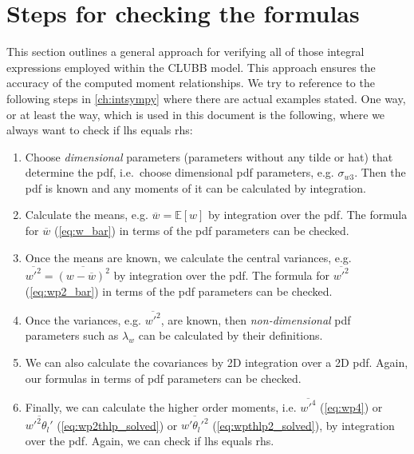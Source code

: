 \section{Steps for checking the formulas}\label{sec:steps_for_checking}

This section outlines a general approach for verifying all of those integral expressions
employed within the \gls{CLUBB} model.
This approach ensures the accuracy of the computed moment relationships.
We try to reference to the following steps in \cref{ch:intsympy} where there are actual examples stated.
One way, or at least the way, which is used in this document is the following,
where we always want to check if \gls{lhs} equals \gls{rhs}:

\begin{enumerate}
    \item\label{itm:checkingstep_1}
    Choose \emph{dimensional} parameters (parameters without any tilde or hat) that determine the \gls{pdf},
    i.e.\ choose dimensional \gls{pdf} parameters, e.g. $\sigma_{w 3}$.
    Then the \gls{pdf} is known and any moments of it can be calculated by integration.

    \item\label{itm:checkingstep_2}
    Calculate the means, e.g. $\overline{w} = \mathbb{E}[w]$ by integration over the \gls{pdf}.
    The formula for $\overline{w}$ (\cref{eq:w_bar}) in terms of the \gls{pdf} parameters can be checked.

    \item\label{itm:checkingstep_3}
    Once the means are known, we calculate the central variances,
    e.g.  $\overline{w'^2} = \overline{(w-\overline{w})^2}$ by integration over the \gls{pdf}.
    The formula for $\overline{w'^2}$ (\cref{eq:wp2_bar}) in terms of the \gls{pdf} parameters can be checked.

    \item\label{itm:checkingstep_4}
    Once the variances, e.g. $\overline{w'^2}$, are known,
    then \emph{non-dimensional} \gls{pdf} parameters such as $\lambda_w$ can be calculated by their definitions.

    \item\label{itm:checkingstep_5}
    We can also calculate the covariances by 2D integration over a 2D \gls{pdf}.
    Again, our formulas in terms of \gls{pdf} parameters can be checked.

    \item\label{itm:checkingstep_6}
    Finally, we can calculate the higher order moments,
    i.e. $\overline{w'^4}$ (\cref{eq:wp4}) or $\overline{w'^2 \theta_l'}$ (\cref{eq:wp2thlp_solved})
    or $\overline{w' \theta_l'^2}$ (\cref{eq:wpthlp2_solved}),
    by integration over the \gls{pdf}.
    Again, we can check if \gls{lhs} equals \gls{rhs}.


\end{enumerate}
